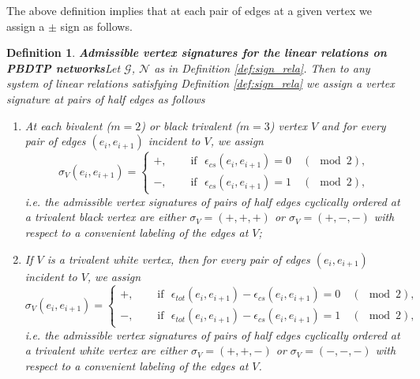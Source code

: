 \documentclass[11pt]{amsart}
\theoremstyle{plain}
\numberwithin{equation}{section}
\newtheorem{definition}{Definition}[subsection]
\begin{document}
The above definition implies that at each pair of edges at a given vertex we assign a $\pm$ sign as follows.
\begin{definition}\textbf{Admissible vertex signatures for the linear relations on PBDTP networks}\label{def:vertex_sign}
Let $\mathcal G$, $\mathcal N$ as in Definition \ref{def:sign_rela}. Then to any system of linear relations satisfying Definition \ref{def:sign_rela} we assign a vertex signature at pairs of half edges as follows
\begin{enumerate}
\item  At each bivalent ($m=2$) or black trivalent ($m=3$) vertex $V$ and for every pair of edges $(e_i,e_{i+1})$ incident to $V$, we assign
\[
\sigma_V ( e_i, e_{i+1}) =\left\{ \begin{array}{ll} +, &\quad \mbox{ if } \,\,\epsilon_{cs}(e_i,e_{i+1}) = 0 \quad (\!\!\!\!\!\!\mod 2),\\
-, &\quad \mbox{ if } \,\,\epsilon_{cs}(e_i,e_{i+1}) = 1 \quad (\!\!\!\!\!\!\mod 2),
\end{array}\right.
\] 
{\sl i.e.} the admissible vertex signatures of pairs of half edges cyclically ordered at a trivalent black vertex are either
$\sigma_V=(+,+,+)$ or $\sigma_V= (+,-,-)$ with respect to a convenient labeling of the edges at $V$;
\item  If $V$ is a trivalent white vertex, then for every pair of edges $(e_i,e_{i+1})$ incident to $V$, we assign
\[
\sigma_V  ( e_i, e_{i+1}) =\left\{ \begin{array}{ll} +, &\quad \mbox{ if  } \,\,\epsilon_{tot} (e_i,e_{i+1})-\epsilon_{cs} (e_{i},e_{i+1}) = 0 \quad (\!\!\!\!\!\!\mod 2),\\
-, &\quad \mbox{ if  } \,\,\epsilon_{tot} (e_i,e_{i+1})-\epsilon_{cs} (e_{i},e_{i+1}) = 1 \quad (\!\!\!\!\!\!\mod 2),
\end{array}\right.
\]
{\sl i.e.} the admissible vertex signatures of pairs of half edges cyclically ordered at a trivalent white vertex are either
$\sigma_V= (+,+,-)$ or $\sigma_V =(-,-,-)$ with respect to a convenient labeling of the edges at $V$.
\end{enumerate}
\end{definition}
\end{document}
